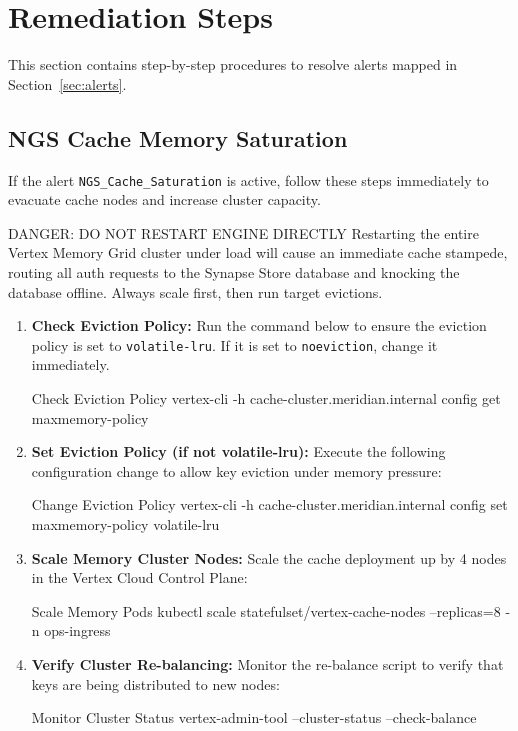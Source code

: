 \section{Remediation Steps}
\label{sec:remediation}
This section contains step-by-step procedures to resolve alerts mapped in Section~\ref{sec:alerts}.

\subsection{NGS Cache Memory Saturation}
\label{sub:cache_remediation}
If the alert \texttt{NGS\_Cache\_Saturation} is active, follow these steps immediately to evacuate cache nodes and increase cluster capacity.

\begin{alertbox}{DANGER: DO NOT RESTART ENGINE DIRECTLY}
    Restarting the entire Vertex Memory Grid cluster under load will cause an immediate cache stampede, routing all auth requests to the Synapse Store database and knocking the database offline. Always scale first, then run target evictions.
\end{alertbox}

\begin{enumerate}
    \item \textbf{Check Eviction Policy:} Run the command below to ensure the eviction policy is set to \texttt{volatile-lru}. If it is set to \texttt{noeviction}, change it immediately.
    \begin{codeblock}{Check Eviction Policy}
vertex-cli -h cache-cluster.meridian.internal config get maxmemory-policy
    \end{codeblock}
    
    \item \textbf{Set Eviction Policy (if not volatile-lru):} Execute the following configuration change to allow key eviction under memory pressure:
    \begin{codeblock}{Change Eviction Policy}
vertex-cli -h cache-cluster.meridian.internal config set maxmemory-policy volatile-lru
    \end{codeblock}
    
    \item \textbf{Scale Memory Cluster Nodes:} Scale the cache deployment up by 4 nodes in the Vertex Cloud Control Plane:
    \begin{codeblock}{Scale Memory Pods}
kubectl scale statefulset/vertex-cache-nodes --replicas=8 -n ops-ingress
    \end{codeblock}
    
    \item \textbf{Verify Cluster Re-balancing:} Monitor the re-balance script to verify that keys are being distributed to new nodes:
    \begin{codeblock}{Monitor Cluster Status}
vertex-admin-tool --cluster-status --check-balance
    \end{codeblock}
\end{enumerate}

